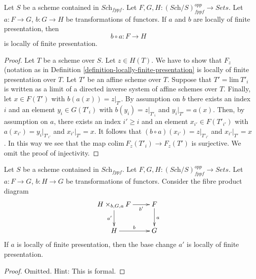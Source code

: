 \begin{lemma}
\label{lemma-composition-locally-finite-presentation}
Let $S$ be a scheme contained in $\textit{Sch}_{fppf}$.
Let $F, G, H : (\textit{Sch}/S)_{fppf}^{opp} \to \textit{Sets}$.
Let $a : F \to G$, $b : G \to H$ be transformations of functors.
If $a$ and $b$ are locally of finite presentation, then
$$
b \circ a : F \longrightarrow H
$$
is locally of finite presentation.
\end{lemma}

\begin{proof}
Let $T$ be a scheme over $S$. Let $z \in H(T)$.
We have to show that $F_z$ (notation as in
Definition \ref{definition-locally-finite-presentation}
is locally of finite presentation over $T$.
Let $T'$ be an affine scheme over $T$.
Suppose that $T' = \text{lim}\ T'_i$ is written as a limit of
a directed inverse system of affine schemes over $T$.
Finally, let $x \in F(T')$ with $b(a(x)) = z|_{T'}$.
By assumption on $b$ there exists an index $i$ and an
element $y_i \in G(T'_i)$ with $b(y_i) = z|_{T'_i}$ and
$y_i|_{T'} = a(x)$.
Then, by assumption on $a$, there exists an index $i' \geq i$
and an element $x_{i'} \in F(T'_{i'})$ with $a(x_{i'}) = y_i|_{T'_{i'}}$
and $x_{i'}|_{T'} = x$. It follows that $(b \circ a)(x_{i'}) = z|_{T'_{i'}}$
and $x_{i'}|_{T'} = x$. In this way we see that the map
$\text{colim}\ F_z(T'_i) \to F_z(T')$ is surjective.
We omit the proof of injectivity.
\end{proof}

\begin{lemma}
\label{lemma-base-change-locally-finite-presentation}
Let $S$ be a scheme contained in $\textit{Sch}_{fppf}$.
Let $F, G, H : (\textit{Sch}/S)_{fppf}^{opp} \to \textit{Sets}$.
Let $a : F \to G$, $b : H \to G$ be transformations of functors.
Consider the fibre product diagram
$$
\xymatrix{
H \times_{b, G, a} F \ar[r]_-{b'} \ar[d]_{a'} & F \ar[d]^a \\
H \ar[r]^b & G
}
$$
If $a$ is locally of finite presentation, then the base change $a'$ is
locally of finite presentation.
\end{lemma}

\begin{proof}
Omitted. Hint: This is formal.
\end{proof}

